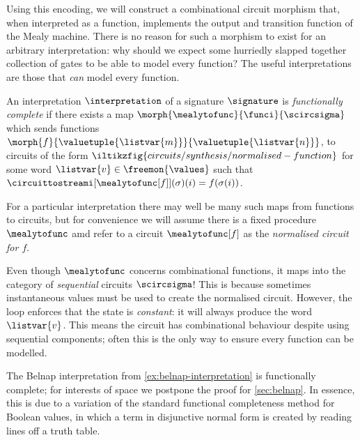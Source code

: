 Using this encoding, we will construct a combinational circuit morphism that,
when interpreted as a function, implements the output and transition function
of the Mealy machine.
There is no reason for such a morphism to exist for an arbitrary interpretation:
why should we expect some hurriedly slapped together collection of gates to be
able to model every function?
The useful interpretations are those that \emph{can} model every function.

\begin{definition}
    An interpretation \(\interpretation\) of a signature \(\signature\) is
    \emph{functionally complete} if there exists a map \(
        \morph{\mealytofunc}{\funci}{\scircsigma}
    \) which sends functions \(
        \morph{f}{\valuetuple{\listvar{m}}}{\valuetuple{\listvar{n}}}
    \), to circuits of the form \(
        \iltikzfig{circuits/synthesis/normalised-function}
    \) for some word \(\listvar{v} \in \freemon{\values}\) such that
    \(\circuittostreami[\mealytofunc[f]](\sigma)(i) = f(\sigma(i))\).
\end{definition}

For a particular interpretation there may well be many such maps from functions
to circuits, but for convenience we will assume there is a fixed procedure
\(\mealytofunc\) amd refer to a circuit \(\mealytofunc[f]\) as the
\emph{normalised circuit for \(f\)}.\

\begin{remark}
    Even though \(\mealytofunc\) concerns combinational functions, it maps into
    the category of \emph{sequential} circuits \(\scircsigma\)!
    This is because sometimes instantaneous values must be used to create the
    normalised circuit.
    However, the loop enforces that the state is \emph{constant}: it will always
    produce the word \(\listvar{v}\).
    This means the circuit has combinational behaviour despite using sequential
    components; often this is the only way to ensure every function can be
    modelled.
\end{remark}

\begin{example}
    The Belnap interpretation from \cref{ex:belnap-interpretation} is
    functionally complete; for interests of space we postpone the proof for
    \cref{sec:belnap}.
    In essence, this is due to a variation of the standard functional
    completeness method for Boolean values, in which a term in disjunctive
    normal form is created by reading lines off a truth table.
\end{example}

